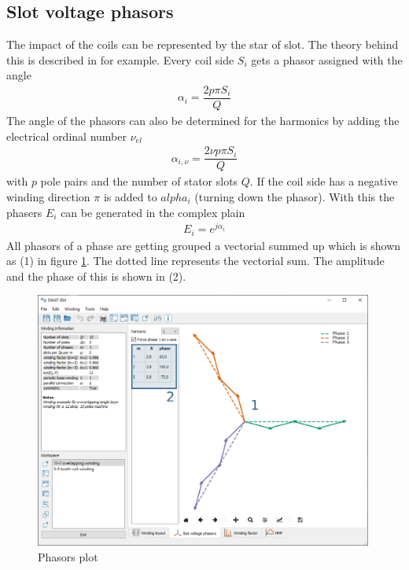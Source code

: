 \documentclass[]{scrreprt}
\begin{document}
\subsection{Slot voltage phasors}
The impact of the coils can be represented by the star of slot. The theory behind this is
described in \cite{mueller1996berechnung} for example. Every coil side $S_i$ gets a phasor assigned with 
the angle 
\begin{align}
\alpha_i = \dfrac{2p \pi S_i}{Q}  \label{eqn:phasors_angle}
\end{align} 
%
The angle of the phasors can also be determined for the harmonics by adding the electrical ordinal
number $\nu_{el}$
\begin{align}
\alpha_{i,\nu} = \dfrac{2\nu p \pi S_i}{Q}  \label{eqn:phasors_angle2}
\end{align} 
%
% 
with $p$ pole pairs and the number of stator slots $Q$. If the coil side has a negative winding direction
$\pi$ is added to $alpha_i$ (turning down the phasor). With this the phasers $E_i$ can be generated
in the complex plain
%
\begin{align}
E_i = e^{j\alpha_i}
\end{align} 
%
All phasors of a phase are getting grouped a vectorial summed up which is shown as (1) in figure 
\ref{fig:phasors}. The dotted line represents the vectorial sum. The amplitude and the phase of
this is shown in (2).
%
\begin{figure}[htpb]
    \centering
    \includegraphics[width=0.99\textwidth,angle=0]{fig/mainwindow_phasors}
    \caption{Phasors plot}
    \label{fig:phasors}
\end{figure}
\end{document}
